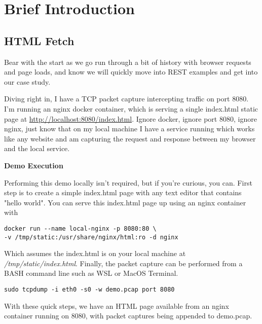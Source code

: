 \chapter{Brief Introduction}
\section{HTML Fetch}

Bear with the start as we go run through a bit of history with browser requests and page loads, and know we will quickly move into REST examples and get into our case study.

Diving right in, I have a TCP packet capture intercepting traffic on port 8080.  I'm running an nginx docker container, which is serving a single index.html static page at \url{http://localhost:8080/index.html}. Ignore docker, ignore port 8080, ignore nginx, just know that on my local machine I have a service running which works like any website and am capturing the request and response between my browser and the local service.

\begin{sidebar}
\begin{minipage}{\linewidth}
\begin{center}
\textbf{Demo Execution}
\end{center}
Performing this demo locally isn't required, but if you're curious, you can.  First step is to create a simple index.html page with any text editor that contains "hello world".  You can serve this index.html page up using an nginx container with
\begin{code}
\begin{lstlisting}[belowskip=-\baselineskip]
docker run --name local-nginx -p 8080:80 \
-v /tmp/static:/usr/share/nginx/html:ro -d nginx
\end{lstlisting}
\end{code}
Which assumes the index.html is on your local machine at \textit{/tmp/static/index.html}. Finally, the packet capture can be performed from a BASH command line such as WSL or MacOS Terminal.
\begin{code}
\begin{lstlisting}[belowskip=-\baselineskip]
sudo tcpdump -i eth0 -s0 -w demo.pcap port 8080
\end{lstlisting}
\end{code}
With these quick steps, we have an HTML page available from an nginx container running on 8080, with packet captures being appended to demo.pcap.
\end{minipage}
\end{sidebar}

